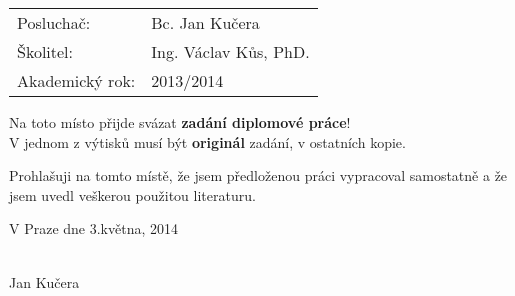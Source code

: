 \begin{tabular}{ll} 
{\Large Posluchač:} & {\Large Bc. Jan Kučera} \\[1mm]
{\Large \v{S}kolitel:} & {\Large Ing. Václav Kůs, PhD.} \\[2mm]
{\Large Akademický rok:}     & {\Large 2013/2014}
\end{tabular}


\newpage

\thispagestyle{empty}

\noindent
{\Large
Na toto místo přijde svázat \textbf{zadání diplomové práce}!\\
V jednom z výtisků musí být \textbf{originál} zadání, v ostatních kopie.\par}


\newpage

\thispagestyle{empty}



\vspace{0.5cm}

Prohlašuji na tomto místě, že jsem předloženou práci vypracoval samostatně 
a že jsem uvedl veškerou použitou literaturu.

\vspace{1.5cm}

\noindent
\begin{minipage}[b]{5cm}
V Praze dne 3.kv\v{e}tna, 2014
\end{minipage}
\hfill
\begin{minipage}[t]{5cm}
\begin{center}
\dotfill\\
Jan Kučera
\end{center}
\end{minipage}

\vspace*{2cm}


\newpage

\thispagestyle{empty}

